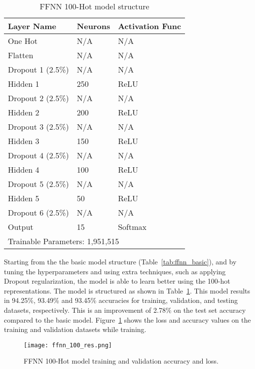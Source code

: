 \documentclass[11pt,a4paper]{article}
\begin{document}
\begin{table}[h]
\centering
\caption{FFNN 100-Hot model structure}
\label{tab:ffnn_100}
\begin{tabular}{|l|l|l|}
\hline
Layer Name & Neurons & Activation Func \\ \hline
One Hot & N/A & N/A \\ \hline
Flatten & N/A & N/A \\ \hline
Dropout 1 (2.5\%) & N/A & N/A \\ \hline
Hidden 1 & 250 & ReLU \\ \hline
Dropout 2 (2.5\%) & N/A & N/A \\ \hline
Hidden 2 & 200 & ReLU \\ \hline
Dropout 3 (2.5\%) & N/A & N/A \\ \hline
Hidden 3 & 150 & ReLU \\ \hline
Dropout 4 (2.5\%) & N/A & N/A \\ \hline
Hidden 4 & 100 & ReLU \\ \hline
Dropout 5 (2.5\%) & N/A & N/A \\ \hline
Hidden 5 & 50 & ReLU \\ \hline
Dropout 6 (2.5\%) & N/A & N/A \\ \hline
Output & 15 & Softmax \\ \hline
\multicolumn{3}{|l|}{Trainable Parameters: 1,951,515} \\ \hline
\end{tabular}
\end{table}

Starting from the the basic model structure (Table~\ref{tab:ffnn_basic}), and by tuning the hyperparameters and using extra techniques, such as applying Dropout regularization, the model is able to learn better using the 100-hot representations. The model is structured as shown in Table~\ref{tab:ffnn_100}. This model results in 94.25\%, 93.49\% and 93.45\% accuracies for training, validation, and testing datasets, respectively. This is an improvement of 2.78\% on the test set accuracy compared to the basic model. Figure~\ref{fig:ffnn_100_res} shows the loss and accuracy values on the training and validation datasets while training.

\begin{figure}[h]
    \centering
    \texttt{[image: ffnn\_100\_res.png]}
    \caption{FFNN 100-Hot model training and validation accuracy and loss.}
    \label{fig:ffnn_100_res}
\end{figure}
\end{document}
